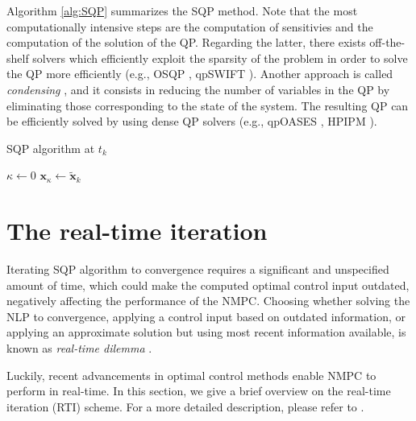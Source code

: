 Algorithm \ref{alg:SQP} summarizes the SQP method. Note that the most 
computationally intensive steps are the computation of sensitivies and the 
computation of the solution of the QP. Regarding the latter, there exists off-the-shelf
solvers which efficiently exploit the sparsity of the problem in order to
solve the QP more efficiently (e.g., OSQP \cite{Stellato2020OSQP}, qpSWIFT
\cite{Pandala2019qpSWIFT}). Another approach is called 
\textit{condensing} \cite{Bock1984MultipleShooting},
and it consists in reducing the number of variables in the QP by eliminating 
those corresponding to the state of the system. The resulting QP can be
efficiently solved by using dense QP solvers (e.g., qpOASES \cite{Ferreau2014qpOASES},
HPIPM \cite{Frison2020HPIPM}).

\begin{algorithm}
	\small
	\caption{SQP algorithm at $t_k$}
	\label{alg:SQP}
    $\kappa \leftarrow 0$\;
    $\bm{x}_\kappa \leftarrow \tilde{\bm{x}}_k$\;
    \;
\end{algorithm}

\section{The real-time iteration}
Iterating SQP algorithm to convergence requires a significant and unspecified
amount of time, which could make the computed optimal control input outdated, negatively
affecting the performance of the NMPC. Choosing whether solving the NLP to 
convergence, applying a control input based on outdated information, or 
applying an approximate solution but using most recent information available, 
is known as \textit{real-time dilemma} \cite{Dihel2002Realtimeoptimization}.

Luckily, recent advancements in optimal control methods enable NMPC to perform 
in real-time. In this section, we give a brief overview on the real-time iteration (RTI)
scheme. For a more detailed description, please refer to \cite{Gros2020Fromlineartononlinear}.

